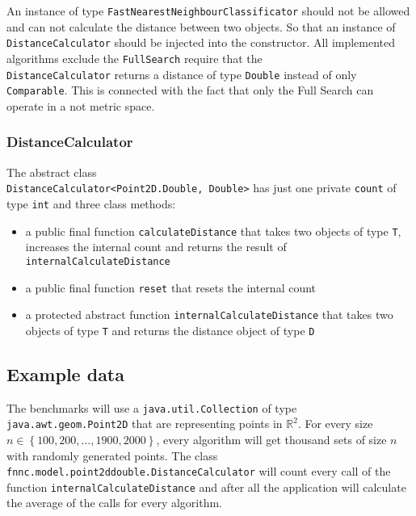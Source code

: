 \documentclass[runningheads,a4paper]{llncs}
\begin{document}
An instance of type \verb+FastNearestNeighbourClassificator+ should not be allowed and can not calculate the distance
between two objects. So that an instance of \verb+DistanceCalculator+ should be injected into the constructor. All
implemented algorithms exclude the \verb+FullSearch+ require that the\\ \verb+DistanceCalculator+ returns a distance of
type \verb+Double+ instead of only\\ \verb+Comparable+. This is connected with the fact that only the Full Search can
operate in a not metric space.

\subsubsection{DistanceCalculator}

The abstract class\\ \verb+DistanceCalculator<Point2D.Double, Double>+ has just one private \verb+count+ of type
\verb+int+ and three class methods:
\begin{itemize}
	\item a public final function \verb+calculateDistance+ that takes two objects of type \verb+T+, increases the
		internal count and returns the result of\\ \verb+internalCalculateDistance+
	\item a public final function \verb+reset+ that resets the internal count
	\item a protected abstract function \verb+internalCalculateDistance+ that takes two objects of type \verb+T+ and
		returns the distance object of type \verb+D+
\end{itemize}

\subsection{Example data}

The benchmarks will use a \verb+java.util.Collection+ of type\\ \verb+java.awt.geom.Point2D+ that are representing
points in $\mathbb{R}^2$. For every size $n \in \left\{ {100, 200, \dots, 1900, 2000}\right\}$, every algorithm will get
thousand sets of size $n$ with randomly generated points. The class\\ \verb+fnnc.model.point2ddouble.DistanceCalculator+
will count every call of the function \verb+internalCalculateDistance+ and after all the application will calculate the
average of the calls for every algorithm.
\end{document}
